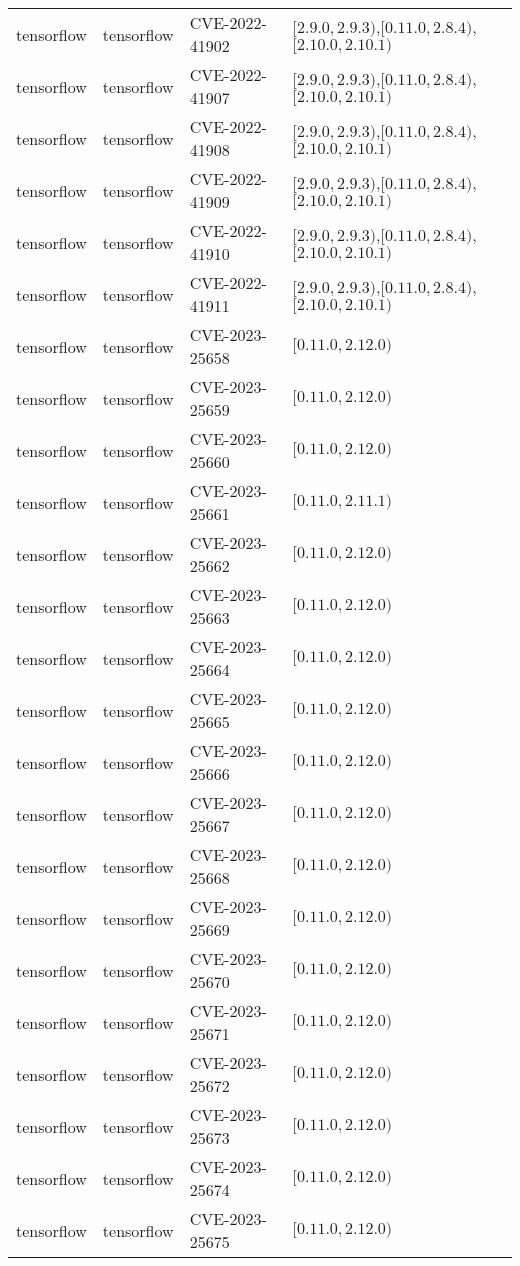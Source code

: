 \begin{tabular}{llll}
tensorflow & tensorflow & CVE-2022-41902 & $[2.9.0,2.9.3)$,$[0.11.0,2.8.4)$,$[2.10.0,2.10.1)$ \\
tensorflow & tensorflow & CVE-2022-41907 & $[2.9.0,2.9.3)$,$[0.11.0,2.8.4)$,$[2.10.0,2.10.1)$ \\
tensorflow & tensorflow & CVE-2022-41908 & $[2.9.0,2.9.3)$,$[0.11.0,2.8.4)$,$[2.10.0,2.10.1)$ \\
tensorflow & tensorflow & CVE-2022-41909 & $[2.9.0,2.9.3)$,$[0.11.0,2.8.4)$,$[2.10.0,2.10.1)$ \\
tensorflow & tensorflow & CVE-2022-41910 & $[2.9.0,2.9.3)$,$[0.11.0,2.8.4)$,$[2.10.0,2.10.1)$ \\
tensorflow & tensorflow & CVE-2022-41911 & $[2.9.0,2.9.3)$,$[0.11.0,2.8.4)$,$[2.10.0,2.10.1)$ \\
tensorflow & tensorflow & CVE-2023-25658 & $[0.11.0,2.12.0)$ \\
tensorflow & tensorflow & CVE-2023-25659 & $[0.11.0,2.12.0)$ \\
tensorflow & tensorflow & CVE-2023-25660 & $[0.11.0,2.12.0)$ \\
tensorflow & tensorflow & CVE-2023-25661 & $[0.11.0,2.11.1)$ \\
tensorflow & tensorflow & CVE-2023-25662 & $[0.11.0,2.12.0)$ \\
tensorflow & tensorflow & CVE-2023-25663 & $[0.11.0,2.12.0)$ \\
tensorflow & tensorflow & CVE-2023-25664 & $[0.11.0,2.12.0)$ \\
tensorflow & tensorflow & CVE-2023-25665 & $[0.11.0,2.12.0)$ \\
tensorflow & tensorflow & CVE-2023-25666 & $[0.11.0,2.12.0)$ \\
tensorflow & tensorflow & CVE-2023-25667 & $[0.11.0,2.12.0)$ \\
tensorflow & tensorflow & CVE-2023-25668 & $[0.11.0,2.12.0)$ \\
tensorflow & tensorflow & CVE-2023-25669 & $[0.11.0,2.12.0)$ \\
tensorflow & tensorflow & CVE-2023-25670 & $[0.11.0,2.12.0)$ \\
tensorflow & tensorflow & CVE-2023-25671 & $[0.11.0,2.12.0)$ \\
tensorflow & tensorflow & CVE-2023-25672 & $[0.11.0,2.12.0)$ \\
tensorflow & tensorflow & CVE-2023-25673 & $[0.11.0,2.12.0)$ \\
tensorflow & tensorflow & CVE-2023-25674 & $[0.11.0,2.12.0)$ \\
tensorflow & tensorflow & CVE-2023-25675 & $[0.11.0,2.12.0)$ \\

\end{tabular}
